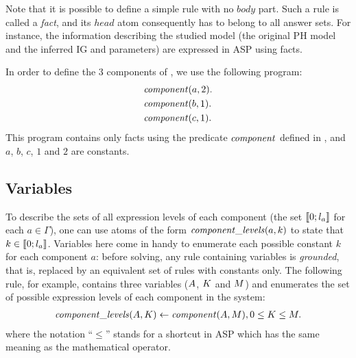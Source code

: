 


Note that it is possible to define a simple rule with no $body$ part.
Such a rule is called a \emph{fact}, and its $head$ atom consequently has to belong to all answer sets.
For instance, the information describing the studied model (the original PH model and the inferred IG and parameters) are expressed in ASP using facts.

\begin{example}\label{ex:asp-component}
In order to define the 3 components of , we use the following program:
\begin{align*}
  &\mathit{component}(a, 2). \\
  &\mathit{component}(b, 1). \\
  &\mathit{component}(c, 1).
\end{align*}
This program contains only facts using the predicate $\mathit{component}$ defined in ,
and $a$, $b$, $c$, $1$ and $2$ are constants.
\end{example}



\subsection{Variables}
To describe the sets of all expression levels of each component (\ie the set $\llbracket 0 ; l_a \rrbracket$ for each $a \in \Gamma$),
one can use atoms of the form $\mathit{component\_levels}(a, k)$ to state that $k \in \llbracket 0 ; l_a \rrbracket$.
Variables here come in handy to enumerate each possible constant $k$ for each component $a$:
before solving, any rule containing variables is \emph{grounded}, that is, replaced by an equivalent set of rules with constants only.
The following rule, for example, contains three variables ($A$, $K$ and $M$) and enumerates the set of possible expression levels of each component in the system:
\begin{align*}
  \mathit{component\_levels}(A, K) \leftarrow \mathit{component}(A, M), 0 \leq K \leq M.
\end{align*}
where the notation “$\leq$” stands for a shortcut in ASP which has the same meaning as the mathematical operator.

